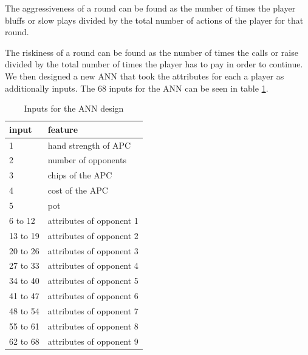 The aggressiveness of a round can be found as the number of times the player bluffs or slow plays divided by the total number of actions of the player for that round.

The riskiness of a round can be found as the number of times the calls or raise divided by the total number of times the player has to pay in order to continue.\\

We then designed a new ANN that took the attributes for each a player as additionally inputs. The 68 inputs for the ANN can be seen in table \ref{tab:ann-design-con}. 

\begin{table}
\center
\begin{tabular}{ | l | l | }
\hline
input & feature \\
\hline
1 & hand strength of APC\\
2 & number of opponents\\
3 & chips of the APC\\
4 & cost of the APC\\
5 & pot\\
6 to 12 & attributes of opponent 1\\
13 to 19 & attributes of opponent 2\\
20 to 26 & attributes of opponent 3\\
27 to 33 & attributes of opponent 4\\
34 to 40 & attributes of opponent 5\\
41 to 47 & attributes of opponent 6\\
48 to 54 & attributes of opponent 7\\
55 to 61 & attributes of opponent 8\\
62 to 68 & attributes of opponent 9\\
\hline
\end{tabular}
\caption{Inputs for the ANN design \label{tab:ann-design-con}}
\end{table}
